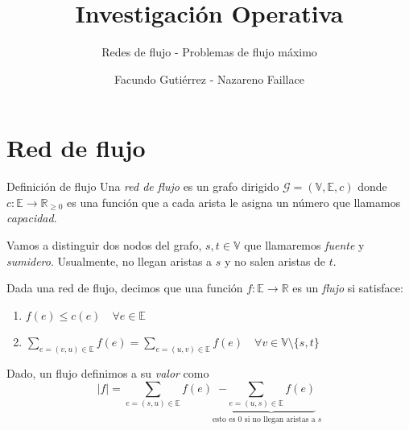\documentclass[8pt,xcolor={dvipsnames}]{beamer}
\title{Investigación Operativa}
\subtitle{Redes de flujo - Problemas de flujo m\'aximo}
\date{}
\author{Facundo Gutiérrez - Nazareno Faillace}
\institute{Departamento de Matemática, FCEN, UBA}
\begin{document}
\maketitle

\section{Red de flujo}

\begin{frame}{Definici\'on de flujo}
	Una \textit{red de flujo} es un grafo dirigido $\mathcal{G} = (\mathbb{V},\mathbb{E},c)$ donde $c : \mathbb{E} \to \mathbb{R}_{\geq 0}$ es una funci\'on que a cada arista le asigna un n\'umero que llamamos \textit{capacidad}.
	
	Vamos a distinguir dos nodos del grafo, $s,t \in \mathbb{V}$ que llamaremos \textit{fuente} y \textit{sumidero}. Usualmente, no llegan aristas a $s$ y no salen aristas de $t$.
	
	\pause
	Dada una red de flujo, decimos que una funci\'on $f : \mathbb{E} \to \mathbb{R}$ es un \textit{flujo} si satisface:
	\begin{enumerate}
		\item $f(e) \leq c(e) \quad \forall e \in \mathbb{E}$
		\item $\sum\limits_{e=(v,u) \in \mathbb{E}} f(e) = \sum\limits_{e=(u,v) \in \mathbb{E}} f(e) \quad \forall v \in \mathbb{V}\setminus \{s,t\}$
	\end{enumerate} 
	
	Dado, un flujo definimos a su \textit{valor} como $$|f| = \sum\limits_{e=(s,u) \in \mathbb{E}} f(e) \underset{\text{esto es $0$ si no llegan aristas a }s}{-\underbrace{\sum\limits_{e = (u,s) \in \mathbb{E}} f(e)}}$$
	
\end{frame}
\end{document}
